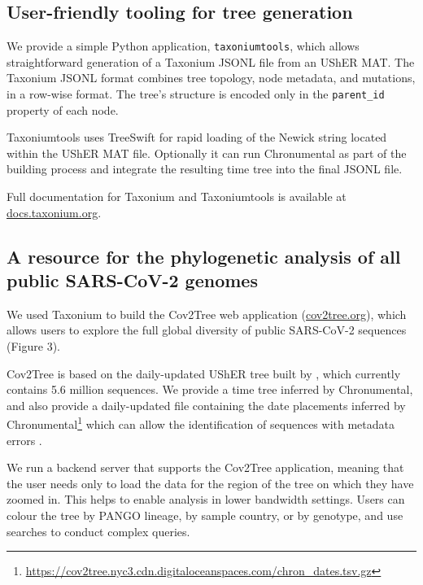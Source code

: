 \subsection*{User-friendly tooling for tree generation}

We provide a simple Python application, \texttt{taxoniumtools}, which allows straightforward generation of a Taxonium JSONL file from an UShER MAT. The Taxonium JSONL format combines tree topology, node metadata, and mutations, in a row-wise format. The tree's structure is encoded only in the \texttt{parent\_id} property of each node.

Taxoniumtools uses TreeSwift \citep{moshiri2020treeswift} for rapid loading of the Newick string located within the UShER MAT file. Optionally it can run Chronumental \citep{chronumental} as part of the building process and integrate the resulting time tree into the final JSONL file.

Full documentation for Taxonium and Taxoniumtools is available at \href{http://docs.taxonium.org}{docs.taxonium.org}.

\subsection*{A resource for the phylogenetic analysis of all public SARS-CoV-2 genomes}

We used Taxonium to build the Cov2Tree web application (\href{http://cov2tree.org}{cov2tree.org}), which allows users to explore the full global diversity of public SARS-CoV-2 sequences (Figure 3). 

Cov2Tree is based on the daily-updated UShER tree built by \cite{McBroome2021}, which currently contains 5.6 million sequences. We provide a time tree inferred by Chronumental, and also provide a daily-updated file containing the date placements inferred by Chronumental\footnote{\url{https://cov2tree.nyc3.cdn.digitaloceanspaces.com/chron_dates.tsv.gz}} which can allow the identification of sequences with metadata errors \citep{chronumental}.

We run a backend server that supports the Cov2Tree application, meaning that the user needs only to load the data for the region of the tree on which they have zoomed in. This helps to enable analysis in lower bandwidth settings. Users can colour the tree by PANGO lineage, by sample country, or by genotype, and use searches to conduct complex queries.


